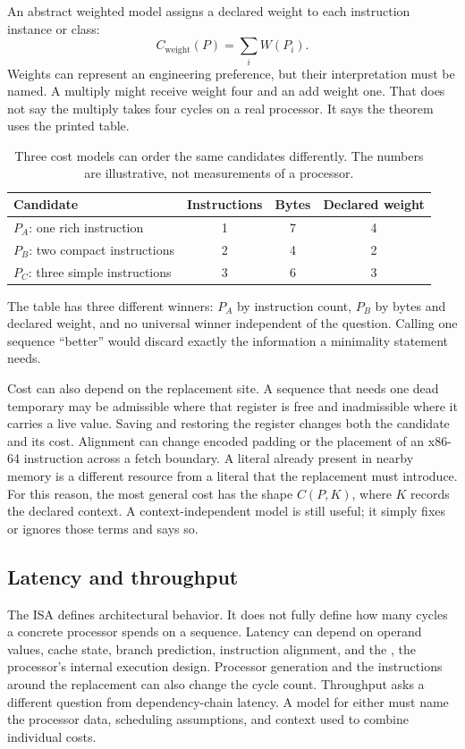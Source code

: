 An abstract weighted model assigns a declared weight to each instruction
instance or class:
\[
  C_{\mathrm{weight}}(P)=\sum_i W(P_i).
\]
Weights can represent an engineering preference, but their interpretation
must be named. A multiply might receive weight four and an add weight one.
That does not say the multiply takes four cycles on a real processor. It says
the theorem uses the printed table.

\begin{table}[htbp]
\centering
\caption{Three cost models can order the same candidates differently. The
numbers are illustrative, not measurements of a processor.}
\begin{tabular}{lccc}
\toprule
Candidate & Instructions & Bytes & Declared weight \\
\midrule
\(P_A\): one rich instruction & 1 & 7 & 4 \\
\(P_B\): two compact instructions & 2 & 4 & 2 \\
\(P_C\): three simple instructions & 3 & 6 & 3 \\
\bottomrule
\end{tabular}
\label{tab:cost-orders}
\end{table}

The table has three different winners: \(P_A\) by instruction count, \(P_B\)
by bytes and declared weight, and no universal winner independent of the
question. Calling one sequence ``better'' would discard exactly the
information a minimality statement needs.

Cost can also depend on the replacement site. A sequence that needs one dead
temporary may be admissible where that register is free and inadmissible where
it carries a live value. Saving and restoring the register changes both the
candidate and its cost. Alignment can change encoded padding or the placement
of an x86-64 instruction across a fetch boundary. A literal already present in
nearby memory is a different resource from a literal that the replacement
must introduce. For this reason, the most general cost has the shape
\(C(P,K)\), where \(K\) records the declared context. A context-independent
model is still useful; it simply fixes or ignores those terms and says so.

\subsection{Latency and throughput}

The ISA defines architectural behavior. It does not fully define how many
cycles a concrete processor spends on a sequence. Latency can depend on
operand values, cache state, branch prediction, instruction alignment, and the
, the processor's internal execution design.
Processor generation and the instructions around the replacement can also
change the cycle count.
Throughput asks a different question from dependency-chain latency. A model
for either must name the processor data, scheduling assumptions, and context
used to combine individual costs.

